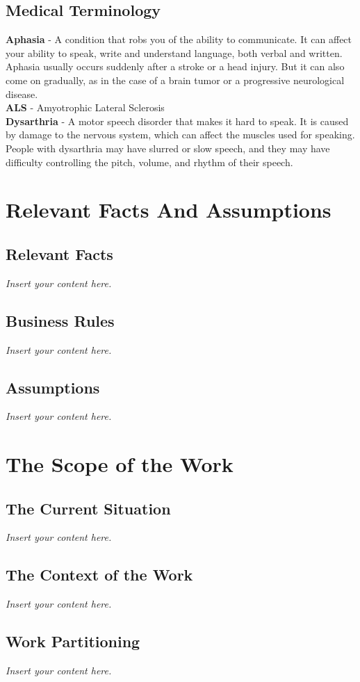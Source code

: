 \documentclass[12pt]{article}
\newcommand{\lips}{\textit{Insert your content here.}}
\begin{document}
\subsection{Medical Terminology}
\textbf{Aphasia} - A condition that robs you of the ability to communicate. It can affect your ability to speak, write and understand language, both verbal and written. Aphasia usually occurs suddenly after a stroke or a head injury. But it can also come on gradually, as in the case of a brain tumor or a progressive neurological disease. \\
\textbf{ALS} - Amyotrophic Lateral Sclerosis \\
\textbf{Dysarthria} - A motor speech disorder that makes it hard to speak. It is caused by damage to the nervous system, which can affect the muscles used for speaking. People with dysarthria may have slurred or slow speech, and they may have difficulty controlling the pitch, volume, and rhythm of their speech. \\

\section{Relevant Facts And Assumptions}
\subsection{Relevant Facts}
\lips
\subsection{Business Rules}
\lips
\subsection{Assumptions}
\lips

\section{The Scope of the Work}
\subsection{The Current Situation}
\lips
\subsection{The Context of the Work}
\lips
\subsection{Work Partitioning}
\lips
\end{document}
